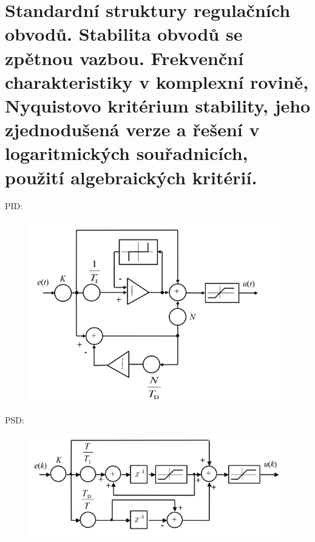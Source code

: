 \section{Standardní struktury regulačních obvodů. Stabilita obvodů se zpětnou vazbou. Frekvenční charakteristiky v komplexní rovině, Nyquistovo kritérium stability, jeho zjednodušená verze a řešení v logaritmických souřadnicích, použití algebraických kritérií.}
PID:
\begin{figure}[H]
    \includegraphics*[scale = 1.1]{images/PIDschema.png}
\end{figure}


PSD:
\begin{figure}[H]
    \includegraphics*[scale = 1.1]{images/PSDschema.png}
\end{figure}
\newpage

